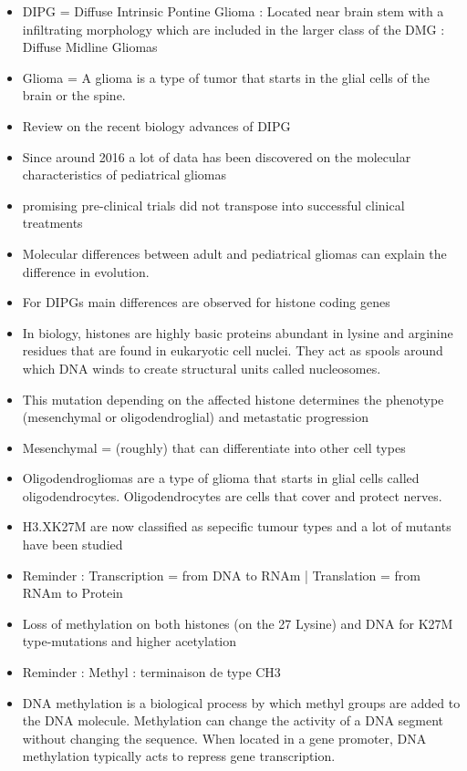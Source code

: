 \documentclass[11pt,a4paper]{article}
\begin{document}
\begin{itemize}
\item DIPG =  Diffuse Intrinsic Pontine Glioma : Located near brain stem with a infiltrating morphology which are included in the larger class of the DMG : Diffuse Midline Gliomas
\item Glioma = A glioma is a type of tumor that starts in the glial cells of the brain or the spine.
\item Review on the recent biology advances of DIPG
\item Since around 2016 a lot of data has been discovered on the molecular characteristics of pediatrical gliomas
\item promising pre-clinical trials did not transpose into successful clinical treatments
\item Molecular differences between adult and pediatrical gliomas can explain the difference in evolution.
\item For DIPGs main differences are observed for histone coding genes
\item In biology, histones are highly basic proteins abundant in lysine and arginine residues that are found in eukaryotic cell nuclei. They act as spools around which DNA winds to create structural units called nucleosomes.
\item This mutation depending on the affected histone determines the phenotype (mesenchymal or oligodendroglial) and metastatic progression
\item Mesenchymal = (roughly) that can differentiate into other cell types
\item Oligodendrogliomas are a type of glioma that starts in glial cells called oligodendrocytes. Oligodendrocytes are cells that cover and protect nerves.
\item H3.XK27M are now classified as sepecific  tumour types and a lot of mutants have been studied
\item Reminder :  Transcription = from DNA to RNAm | Translation =  from RNAm to Protein
\item Loss of methylation on both histones (on the 27 Lysine) and DNA for K27M type-mutations and higher acetylation
\item Reminder : Methyl : terminaison de type CH3
\item DNA methylation is a biological process by which methyl groups are added to the DNA molecule. Methylation can change the activity of a DNA segment without changing the sequence. When located in a gene promoter, DNA methylation typically acts to repress gene transcription.

\end{itemize}
\end{document}
